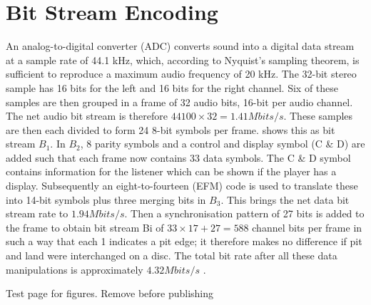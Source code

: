 \documentclass[../main.tex]{subfiles}
\begin{document}
    \section{Bit Stream Encoding}
    An analog-to-digital converter (ADC) converts sound into a digital data stream at a sample rate of 44.1 kHz, which, according to Nyquist's sampling theorem, is sufficient to reproduce a maximum audio frequency of 20 kHz. The 32-bit stereo sample has 16 bits for the left and 16 bits for the right channel. Six of these samples are then grouped in a frame of 32 audio bits, 16-bit per audio channel. The net audio bit stream is therefore $44100 \times 32=1.41 Mbits/s$. These samples are then each divided to form 24 8-bit symbols per frame.  shows this as bit stream $B_1$. In $B_2$, 8 parity symbols and a control and display symbol (C \& D) are added such that each frame now contains 33 data symbols. The C \& D symbol contains information for the listener which can be shown if the player has a display. Subsequently an eight-to-fourteen (EFM) code is used to translate these into 14-bit symbols plus three merging bits in $B_3$. This brings the net data bit stream rate to $1.94 Mbits/s$. Then a synchronisation pattern of 27 bits is added to the frame to obtain bit stream Bi of $33 \times 17+27=588$ channel bits per frame in such a way that each 1 indicates a pit edge; it therefore makes no difference if pit and land were interchanged on a disc. The total bit rate after all these data manipulations is approximately $4.32 Mbits/s$ \autocite{wicker1999reed}.

    \newpage

    Test page for figures. Remove before publishing
\end{document}
